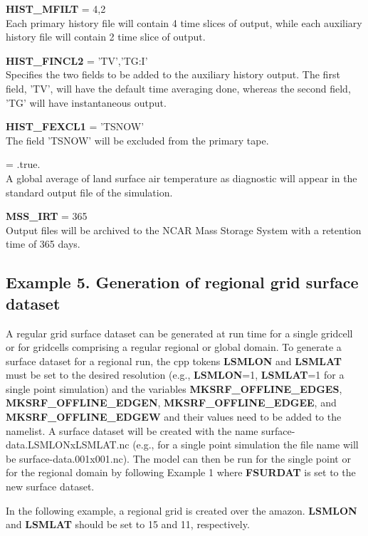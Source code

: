 \medskip \noindent 
{\bf HIST\_MFILT} = 4,2 \\ 
Each primary history file will contain 4 time slices of output, while
each auxiliary history file will contain 2 time slice of output.

\medskip \noindent 
{\bf HIST\_FINCL2} = 'TV','TG:I' \\ 
Specifies the two fields to be added to the auxiliary history output. 
The first field, 'TV', will have the default time averaging done,
whereas the second field, 'TG' will have instantaneous output.

\medskip \noindent 
{\bf HIST\_FEXCL1} = 'TSNOW' \\
The field 'TSNOW' will be excluded from the primary tape.

\medskip {} = .true. \\ 
A global average of land surface air temperature as diagnostic will
appear in the standard output file of the simulation.

\medskip \noindent 
{\bf MSS\_IRT} = 365 \\ 
Output files will be archived to the NCAR Mass Storage System with a
retention time of 365 days.

\subsection {Example 5. Generation of regional grid surface dataset}

\medskip \noindent  
A regular grid surface dataset can be generated at run time for a
single gridcell or for gridcells comprising a regular regional or
global domain. To generate a surface dataset for a regional run, the
cpp tokens {\bf LSMLON} and {\bf LSMLAT} must be set to the desired
resolution (e.g., {\bf LSMLON}=1, {\bf LSMLAT}=1 for a single point
simulation) and the variables {\bf MKSRF\_OFFLINE\_EDGES}, {\bf
MKSRF\_OFFLINE\_EDGEN}, {\bf MKSRF\_OFFLINE\_EDGEE}, and {\bf
MKSRF\_OFFLINE\_EDGEW} and their values need to be added to the
namelist.  A surface dataset will be created with the name
surface-data.LSMLONxLSMLAT.nc (e.g., for a single point simulation the
file name will be surface-data.001x001.nc). The model can then be run
for the single point or for the regional domain by following Example 1
where {\bf FSURDAT} is set to the new surface dataset. 

In the following example, a regional grid is created over the
amazon. {\bf LSMLON} and {\bf LSMLAT} should be set to 15 and 11,
respectively.

